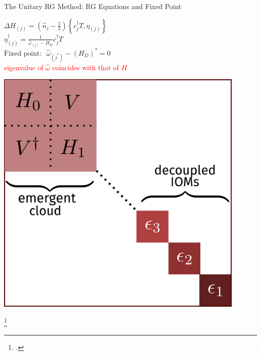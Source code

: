 \documentclass[11pt,aspectratio=169]{beamer}
\newcommand{\focus}[1]{\textcolor{red}{#1}}
\begin{document}
\begin{frame}{The Unitary RG Method: RG Equations and Fixed Point}

\begin{minipage}{0.55\textwidth}
\centering
\(\Delta H_{(j)} = \left(\hat n_j - \frac{1}{2}\right) \left\{c^\dagger_j T, \eta_{(j)}\right\}\)\\[20pt]
\(\eta^\dagger_{(j)} = \frac{1}{\hat \omega_{(j)} - H_D}c^\dagger_j T\) \\[20pt]
\(\text{{Fixed point:}}~ ~ ~\hat \omega_{(j^*)} - \left(H_D\right)^* = 0\)\\[20pt]
\focus{eigenvalue of \(\hat \omega\) coincides with that of \(H\)}

\end{minipage}
\hspace*{\fill}
\begin{minipage}{0.4\textwidth}
	\centering
	\includegraphics[width=0.9\textwidth]{figures/urg_ham_full.pdf}
\end{minipage}
\vspace*{\fill}

\footcite{anirbanurg1,anirbanurg2}
\end{frame}
\end{document}
